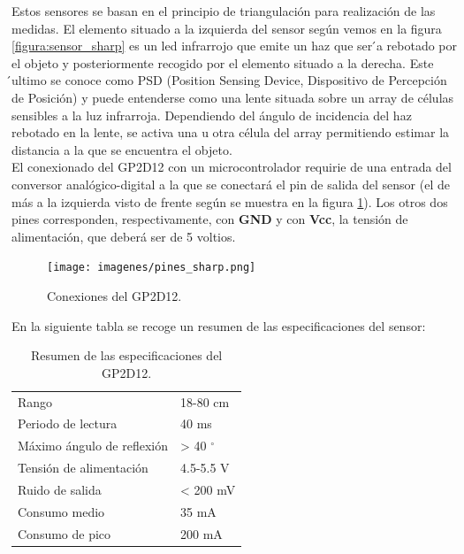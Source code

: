Estos sensores se basan en el principio de triangulación para realización de las medidas. El elemento situado a la izquierda del sensor según vemos en la figura \ref{figura:sensor_sharp}
es un led infrarrojo que emite un haz que ser ́a rebotado por el objeto y posteriormente recogido por el elemento situado a la derecha. Este ́ultimo se conoce como PSD (Position 
Sensing Device, Dispositivo de Percepción de Posición)  y  puede  entenderse  como  una  lente situada sobre un array de células sensibles a la luz infrarroja. Dependiendo del 
ángulo de incidencia del haz rebotado en la lente, se activa una u otra célula del array permitiendo estimar la distancia a la que se encuentra el objeto.\\

El conexionado del GP2D12 con un microcontrolador requirie de una entrada del conversor analógico-digital a la que se conectará el pin de salida del sensor 
(el de más a la izquierda visto de frente según se muestra en la figura \ref{figura:pines_sharp}). Los otros dos pines corresponden, respectivamente, con \textbf{GND} y con
\textbf{Vcc}, la tensión de alimentación, que deberá ser de 5 voltios.\\

 \begin{figure}[H]
  \begin{center}
    \texttt{[image: imagenes/pines\_sharp.png]}
  \end{center}
  \caption{Conexiones del GP2D12.}
  \label{figura:pines_sharp}
\end{figure}

En la siguiente tabla se recoge un resumen de las especificaciones del sensor:\\


\begin{table}[H]
  \begin{center}
    \begin{tabular}{|p{8cm}|p{2cm}|}
      \hline
      {Rango} & {18-80 cm}\\
      {Periodo de lectura} & {40 ms}\\
      {Máximo ángulo de reflexión} & {> 40 $^{\circ}$}\\
      {Tensión de alimentación} & {4.5-5.5 V}\\
      {Ruido de salida} & { < 200 mV }\\
      {Consumo medio} & { 35 mA }\\
      {Consumo de pico} & { 200 mA }\\
      \hline
      \end{tabular}
  \end{center}
  \caption{Resumen de las especificaciones del GP2D12.}
\end{table}

